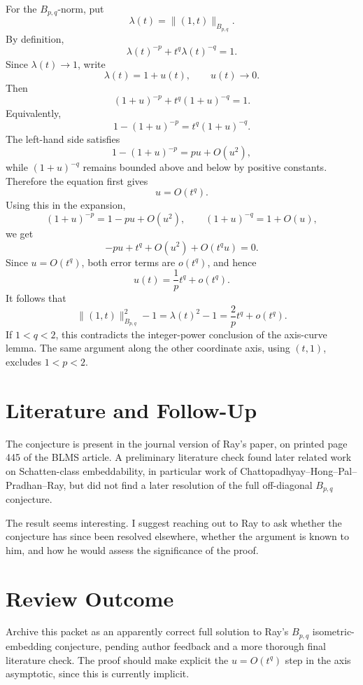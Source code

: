 \documentclass[11pt]{article}
\begin{document}
For the \(B_{p,q}\)-norm, put
\[
  \lambda(t)=\|(1,t)\|_{B_{p,q}}.
\]
By definition,
\[
  \lambda(t)^{-p}+t^q\lambda(t)^{-q}=1.
\]
Since \(\lambda(t)\to1\), write
\[
  \lambda(t)=1+u(t),
  \qquad u(t)\to0.
\]
Then
\[
  (1+u)^{-p}+t^q(1+u)^{-q}=1.
\]
Equivalently,
\[
  1-(1+u)^{-p}=t^q(1+u)^{-q}.
\]
The left-hand side satisfies
\[
  1-(1+u)^{-p}=pu+O(u^2),
\]
while \((1+u)^{-q}\) remains bounded above and below by positive constants.
Therefore the equation first gives
\[
  u=O(t^q).
\]
Using this in the expansion,
\[
  (1+u)^{-p}=1-pu+O(u^2),
  \qquad
  (1+u)^{-q}=1+O(u),
\]
we get
\[
  -pu+t^q+O(u^2)+O(t^q u)=0.
\]
Since \(u=O(t^q)\), both error terms are \(o(t^q)\), and hence
\[
  u(t)=\frac1p t^q+o(t^q).
\]
It follows that
\[
  \|(1,t)\|_{B_{p,q}}^2-1
  =
  \lambda(t)^2-1
  =
  \frac{2}{p}t^q+o(t^q).
\]
If \(1<q<2\), this contradicts the integer-power conclusion of the
axis-curve lemma. The same argument along the other coordinate axis, using
\((t,1)\), excludes \(1<p<2\).

\section*{Literature and Follow-Up}

The conjecture is present in the journal version of Ray's paper, on printed
page 445 of the BLMS article. A preliminary literature check found later
related work on Schatten-class embeddability, in particular work of
Chattopadhyay--Hong--Pal--Pradhan--Ray, but did not find a later resolution
of the full off-diagonal \(B_{p,q}\) conjecture.

The result seems interesting. I suggest reaching out to Ray to ask whether
the conjecture has since been resolved elsewhere, whether the argument is
known to him, and how he would assess the significance of the proof.

\section*{Review Outcome}

Archive this packet as an apparently correct full solution to Ray's
\(B_{p,q}\) isometric-embedding conjecture, pending author feedback and a more
thorough final literature check. The proof should make explicit the
\(u=O(t^q)\) step in the axis asymptotic, since this is currently implicit.
\end{document}
